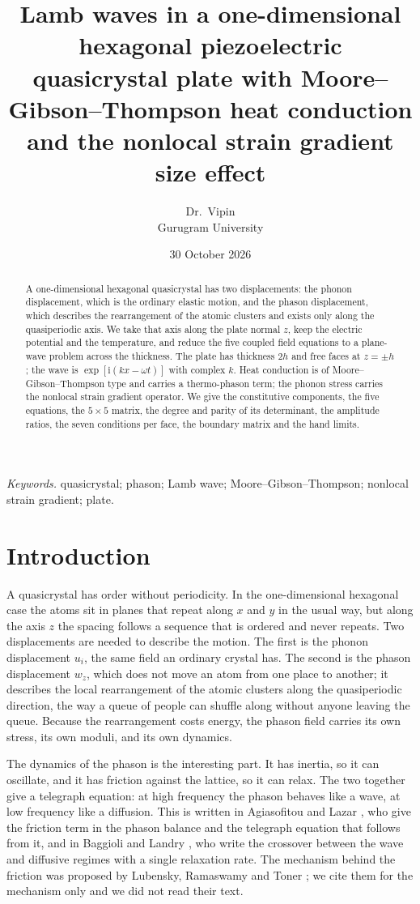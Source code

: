 \documentclass[11pt,a4paper]{article}
\title{\bfseries Lamb waves in a one-dimensional hexagonal piezoelectric\\[2pt]
quasicrystal plate with Moore--Gibson--Thompson heat conduction\\[2pt]
and the nonlocal strain gradient size effect}
\author{Dr.\ Vipin\\ Gurugram University}
\date{30 October 2026}
\newcommand{\ii}{\mathrm{i}}
\begin{document}
\maketitle

\begin{abstract}
\noindent
A one-dimensional hexagonal quasicrystal has two displacements: the phonon displacement, which is the
ordinary elastic motion, and the phason displacement, which describes the rearrangement of the atomic
clusters and exists only along the quasiperiodic axis. We take that axis along the plate normal $z$, keep
the electric potential and the temperature, and reduce the five coupled field equations to a plane-wave
problem across the thickness. The plate has thickness $2h$ and free faces at $z=\pm h$; the wave is
$\exp[\ii(kx-\omega t)]$ with complex $k$. Heat conduction is of Moore--Gibson--Thompson type and carries a
thermo-phason term; the phonon stress carries the nonlocal strain gradient operator. We give the
constitutive components, the five equations, the $5\times5$ matrix, the degree and parity of its
determinant, the amplitude ratios, the seven conditions per face, the boundary matrix and the hand limits.
\end{abstract}

\noindent\textit{Keywords.} quasicrystal; phason; Lamb wave; Moore--Gibson--Thompson; nonlocal strain
gradient; plate.

\section{Introduction}

A quasicrystal has order without periodicity. In the one-dimensional hexagonal case the atoms sit in planes
that repeat along $x$ and $y$ in the usual way, but along the axis $z$ the spacing follows a sequence that
is ordered and never repeats. Two displacements are needed to describe the motion. The first is the phonon
displacement $u_i$, the same field an ordinary crystal has. The second is the phason displacement $w_z$,
which does not move an atom from one place to another; it describes the local rearrangement of the atomic
clusters along the quasiperiodic direction, the way a queue of people can shuffle along without anyone
leaving the queue. Because the rearrangement costs energy, the phason field carries its own stress, its own
moduli, and its own dynamics.

The dynamics of the phason is the interesting part. It has inertia, so it can oscillate, and it has
friction against the lattice, so it can relax. The two together give a telegraph equation: at high
frequency the phason behaves like a wave, at low frequency like a diffusion. This is written in
Agiasofitou and Lazar \cite[Eqs.~(26) and (30)]{Agiasofitou2014}, who give the friction term in the phason
balance and the telegraph equation that follows from it, and in Baggioli and Landry
\cite[Eq.~(17)]{Baggioli2020}, who write the crossover between the wave and diffusive regimes with a single
relaxation rate. The mechanism behind the friction was proposed by Lubensky, Ramaswamy and Toner
\cite{Lubensky1985}; we cite them for the mechanism only and we did not read their text.
\end{document}
